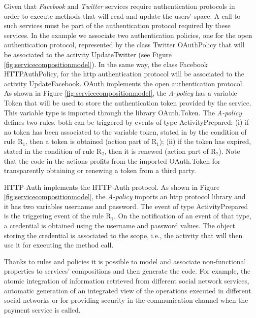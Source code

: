 Given that {\em Facebook} and {\em Twitter} services require authentication protocols in order to execute methods that will read and update the users' space. A call to such services must be part of the authentication protocol required by these services.
In the example we  associate two authentication policies, one for the open authentication protocol, represented by the class {\sf\small Twitter OAuthPolicy} that will be associated to the activity  {\sf\small UpdateTwitter} (see Figure \ref{fig:servicecompositionmodel}). In the same way, the  class {\sf\small Facebook HTTPAuthPolicy}, for the http authentication protocol will be associated to the activity {\sf\small UpdateFacebook}.
 {\sf\small OAuth}  implements the open authentication protocol.
As shown in Figure \ref{fig:servicecompositionmodel}, the {\em A-policy} has a variable {\sf\small Token} that will be used to store the authentication token provided by the service. This variable type is imported through the library {\sf\small OAuth.Token}. The {\em A-policy}  defines two rules, both can be triggered by events of type {\sf\small ActivityPrepared}: (i) if no token has been associated to the variable {\sf\small token}, stated in by the condition of rule {\sf\small R$_1$}, then a token is obtained (action part of {\sf\small R$_1$}); (ii) if the token has expired, stated in the condition of rule {\sf\small R$_2$}, then it is renewed (action part of {\sf\small R$_2$}). Note that the code in the actions profits from the imported  {\sf\small OAuth.Token} for transparently obtaining or renewing a token from a third party.

{\sf\small HTTP-Auth} implements the HTTP-Auth protocol.  As shown in Figure  \ref{fig:servicecompositionmodel}, the {\em A-policy} imports an http protocol library and it has two variables {\sf\small username} and {\sf\small password}.  The event of type {\sf\small ActivityPrepared} is the triggering event of the rule {\sf\small R$_1$}. On the notification of an event of that type, a credential is obtained using the username and password values. The object storing the credential is associated to the scope, i.e., the activity that will then use it for executing the method call.

Thanks to rules and policies  it is possible to model and associate non-functional properties to services' compositions  and then generate the code. For example, the atomic integration of information retrieved from different social network services, automatic generation of an integrated view of the operations executed in different social networks or for providing security in the communication channel when the payment service is called.

